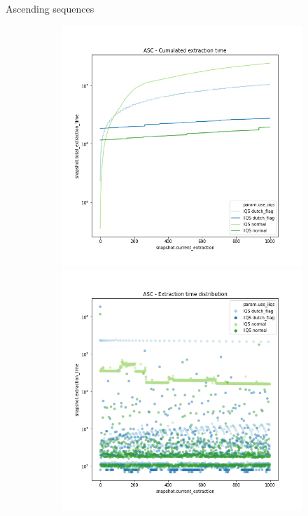 \documentclass{beamer}
\begin{document}
\begin{frame}{Ascending sequences}
    \begin{figure}
        \centering
        \begin{subfigure}[b]{\textwidth}
            \centering
            \includegraphics[height=0.4\textheight]{chapter4/02-benchmark-02-sort-a-case.png.0-1.png}
            \includegraphics[height=0.4\textheight]{chapter4/02-benchmark-02-sort-a-case.png.1-1.png}

\end{subfigure}
\end{figure}
\end{frame}
\end{document}
